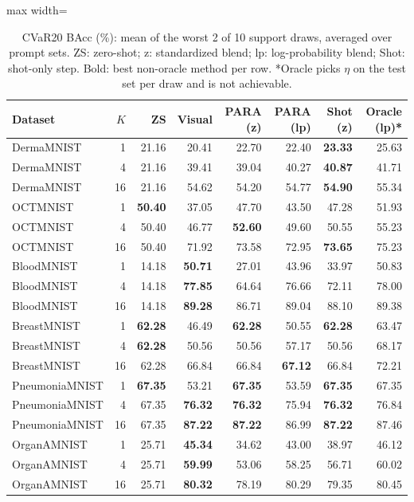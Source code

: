 \begin{table}[t]
\centering
\small
\caption{CVaR20 BAcc (\%): mean of the worst 2 of 10 support draws, averaged over prompt sets. ZS: zero-shot; z: standardized blend; lp: log-probability blend; Shot: shot-only step. Bold: best non-oracle method per row. *Oracle picks $\eta$ on the test set per draw and is not achievable.}
\label{tab:T2b_cvar20_bacc}
\begin{adjustbox}{max width=\linewidth}
\begin{tabular}{lrrrrrrr}
\toprule
Dataset & $K$ & ZS & Visual & PARA (z) & PARA (lp) & Shot (z) & Oracle (lp)* \\
\midrule
DermaMNIST & 1 & 21.16 & 20.41 & 22.70 & 22.40 & \textbf{23.33} & 25.63 \\
DermaMNIST & 4 & 21.16 & 39.41 & 39.04 & 40.27 & \textbf{40.87} & 41.71 \\
DermaMNIST & 16 & 21.16 & 54.62 & 54.20 & 54.77 & \textbf{54.90} & 55.34 \\
OCTMNIST & 1 & \textbf{50.40} & 37.05 & 47.70 & 43.50 & 47.28 & 51.93 \\
OCTMNIST & 4 & 50.40 & 46.77 & \textbf{52.60} & 49.60 & 50.55 & 55.23 \\
OCTMNIST & 16 & 50.40 & 71.92 & 73.58 & 72.95 & \textbf{73.65} & 75.23 \\
BloodMNIST & 1 & 14.18 & \textbf{50.71} & 27.01 & 43.96 & 33.97 & 50.83 \\
BloodMNIST & 4 & 14.18 & \textbf{77.85} & 64.64 & 76.66 & 72.11 & 78.00 \\
BloodMNIST & 16 & 14.18 & \textbf{89.28} & 86.71 & 89.04 & 88.10 & 89.38 \\
BreastMNIST & 1 & \textbf{62.28} & 46.49 & \textbf{62.28} & 50.55 & \textbf{62.28} & 63.47 \\
BreastMNIST & 4 & \textbf{62.28} & 50.56 & 50.56 & 57.17 & 50.56 & 68.17 \\
BreastMNIST & 16 & 62.28 & 66.84 & 66.84 & \textbf{67.12} & 66.84 & 72.21 \\
PneumoniaMNIST & 1 & \textbf{67.35} & 53.21 & \textbf{67.35} & 53.59 & \textbf{67.35} & 67.35 \\
PneumoniaMNIST & 4 & 67.35 & \textbf{76.32} & \textbf{76.32} & 75.94 & \textbf{76.32} & 76.84 \\
PneumoniaMNIST & 16 & 67.35 & \textbf{87.22} & \textbf{87.22} & 86.99 & \textbf{87.22} & 87.46 \\
OrganAMNIST & 1 & 25.71 & \textbf{45.34} & 34.62 & 43.00 & 38.97 & 46.12 \\
OrganAMNIST & 4 & 25.71 & \textbf{59.99} & 53.06 & 58.25 & 56.71 & 60.02 \\
OrganAMNIST & 16 & 25.71 & \textbf{80.32} & 78.19 & 80.29 & 79.35 & 80.45 \\
\bottomrule
\end{tabular}
\end{adjustbox}
\end{table}
